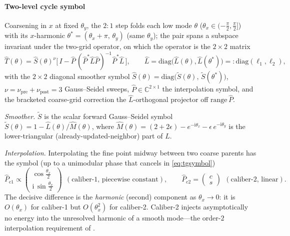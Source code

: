 \documentclass{siamart220329}
\begin{document}
\paragraph{Two-level cycle symbol}
Coarsening in $x$ at fixed $\theta_y$, the $2{:}1$ step folds each low mode $\theta$ ($\theta_x\in(-\tfrac\pi2,\tfrac\pi2]$) with its $x$-harmonic $\theta^{\ast}=(\theta_x{+}\pi,\,\theta_y)$ (same $\theta_y$); the pair spans a subspace invariant under the two-grid operator, on which the operator is the $2\times2$ matrix
\begin{equation}\label{eq:tgsymbol}
\hat T(\theta)=\hat S(\theta)^{\nu}\Big[\,I-\hat P\,(\hat P^{\ast}\hat L\hat P)^{-1}\hat P^{\ast}\hat L\,\Big],\qquad
\hat L=\mathrm{diag}\big(\hat L(\theta),\hat L(\theta^{\ast})\big)=:\mathrm{diag}(\ell_1,\ell_2),
\end{equation}
with the $2\times2$ diagonal smoother symbol $\hat S(\theta)=\mathrm{diag}\big(\tilde S(\theta),\,\tilde S(\theta^{\ast})\big)$,
$\nu=\nu_{\mathrm{pre}}{+}\nu_{\mathrm{post}}=3$ Gauss--Seidel sweeps, $\hat P\in\mathbb C^{2\times1}$ the
interpolation symbol, and the bracketed coarse-grid correction the $\hat L$-orthogonal projector off
$\mathrm{range}\,\hat P$.

\emph{Smoother.} $\tilde S$ is the scalar forward Gauss--Seidel symbol $\tilde S(\theta)=1-\hat L(\theta)/\hat M(\theta)$,
where $\hat M(\theta)=(2{+}2\epsilon)-e^{-\mathrm{i}\theta_x}-\epsilon\,e^{-\mathrm{i}\theta_y}$ is the
lower-triangular (already-updated-neighbor) part of $L$.

\emph{Interpolation.} Interpolating the fine point midway between two coarse parents has the symbol (up to a
unimodular phase that cancels in \eqref{eq:tgsymbol})
\begin{equation}\label{eq:Psymbols}
\hat P_{\mathrm{c1}}\propto\begin{pmatrix}\cos\tfrac{\theta_x}{2}\\[2pt]\mathrm{i}\,\sin\tfrac{\theta_x}{2}\end{pmatrix}
\ \ (\text{caliber-1, piecewise constant}),\qquad
\hat P_{\mathrm{c2}}=\begin{pmatrix}c\\ s\end{pmatrix}\ \ (\text{caliber-2, linear}).
\end{equation}
The decisive difference is the \emph{harmonic} (second) component as $\theta_x\to0$: it is $O(\theta_x)$ for caliber-1 but $O(\theta_x^2)$ for caliber-2. Caliber-2 injects asymptotically no energy into the unresolved harmonic of a smooth mode---the order-$2$ interpolation requirement of \cite[\S4.3]{guide}.
\end{document}
